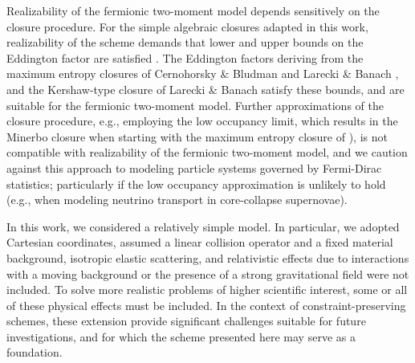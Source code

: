 Realizability of the fermionic two-moment model depends sensitively on the closure procedure.  
For the simple algebraic closures adapted in this work, realizability of the scheme demands that lower and upper bounds on the Eddington factor are satisfied \cite{levermore_1984,lareckiBanach_2011}.  
The Eddington factors deriving from the maximum entropy closures of Cernohorsky \& Bludman \cite{cernohorskyBludman_1994} and Larecki \& Banach \cite{lareckiBanach_2011}, and the Kershaw-type closure of Larecki \& Banach \cite{banachLarecki_2017a} satisfy these bounds, and are suitable for the fermionic two-moment model.  
Further approximations of the closure procedure, e.g., employing the low occupancy limit, which results in the Minerbo closure \cite{minerbo_1978} when starting with the maximum entropy closure of \cite{cernohorskyBludman_1994}), is not compatible with realizability of the fermionic two-moment model, and we caution against this approach to modeling particle systems governed by Fermi-Dirac statistics; particularly if the low occupancy approximation is unlikely to hold (e.g., when modeling neutrino transport in core-collapse supernovae).  

In this work, we considered a relatively simple model.  
In particular, we adopted Cartesian coordinates, assumed a linear collision operator and a fixed material background, isotropic elastic scattering, and relativistic effects due to interactions with a moving background or the presence of a strong gravitational field were not included.  
To solve more realistic problems of higher scientific interest, some or all of these physical effects must be included.  
In the context of constraint-preserving schemes, these extension provide significant challenges suitable for future investigations, and for which the scheme presented here may serve as a foundation.  